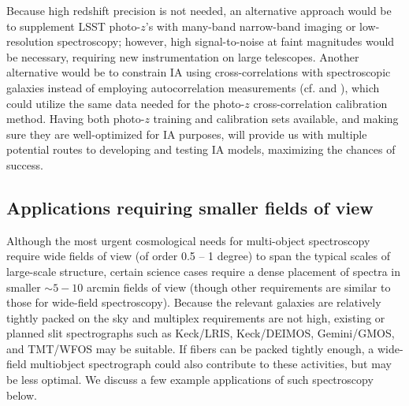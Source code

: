 Because high redshift precision is not needed, an alternative approach would be to supplement LSST photo-$z$'s with many-band narrow-band imaging or low-resolution spectroscopy; however, high signal-to-noise at faint magnitudes would be necessary, requiring new instrumentation on large telescopes.
%
Another alternative would be to constrain IA using cross-correlations with spectroscopic galaxies instead of employing
autocorrelation measurements (cf. \citealt{Blazek} and \citealt{Chisari}), which could utilize the same data needed for the photo-$z$ cross-correlation calibration method.
Having both photo-$z$ training and calibration sets available, and making sure they are
well-optimized for IA purposes, will provide us with multiple potential routes to developing and
testing IA models, maximizing the chances of success.


\subsection{Applications requiring smaller fields of view}

Although the most urgent cosmological needs for multi-object spectroscopy require wide fields of
view (of order 0.5 -- 1 degree) to span the typical scales of large-scale structure, certain science
cases require a dense placement of spectra in smaller $\sim 5-10$ arcmin fields of view (though other requirements are similar to those for wide-field spectroscopy).  Because the relevant galaxies are relatively tightly packed on the sky and multiplex requirements are not high, existing or planned slit spectrographs such as Keck/LRIS, Keck/DEIMOS, Gemini/GMOS, and TMT/WFOS may be suitable.  If fibers can be packed tightly enough, a wide-field multiobject spectrograph could also contribute to these activities, but may be less optimal.  We discuss a few example applications of such spectroscopy below. 

